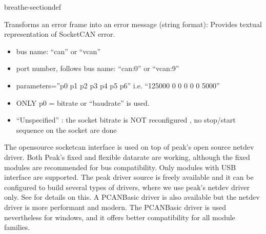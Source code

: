 \documentclass[a4paper,10pt,english]{sphinxmanual}
\begin{document}
\begin{fulllineitems}
\begin{sphinxuseclass}{breathe-sectiondef}
\begin{fulllineitems}
%
\pysigstartmultiline
{}%
\pysigstopmultiline
\sphinxAtStartPar
Transforms an error frame into an error message (string format): Provides textual representation of SocketCAN error. 

\end{fulllineitems}


\end{sphinxuseclass}
\end{fulllineitems}

\begin{itemize}
\item {} 
\sphinxAtStartPar
bus name: “can” or “vcan”

\item {} 
\sphinxAtStartPar
port number, follows bus name: “can:0” or “vcan:9”

\item {} 
\sphinxAtStartPar
parameters=”p0 p1 p2 p3 p4 p5 p6” i.e. “125000 0 0 0 0 0 5000”

\item {} 
\sphinxAtStartPar
ONLY p0 = bitrate or “baudrate” is used.

\item {} 
\sphinxAtStartPar
“Unspecified” : the socket bitrate is NOT reconfigured , no stop/start sequence on the socket are done

\end{itemize}

\sphinxAtStartPar
The open\sphinxhyphen{}source socketcan interface is used on top of peak’s open source netdev driver. Both Peak’s
fixed and flexible datarate are working, although the fixed modules are recommended for bus compatibility.
Only modules with USB interface are supported.
The peak driver source is freely available and it can be configured to build several
types of drivers, where we use peak’s netdev driver only. See  for details on this.
A PCAN\sphinxhyphen{}Basic driver is also available but the netdev driver is more performant and modern. The
PCAN\sphinxhyphen{}Basic driver is used nevertheless for windows, and it offers better compatibility for all module
families.
\end{document}
